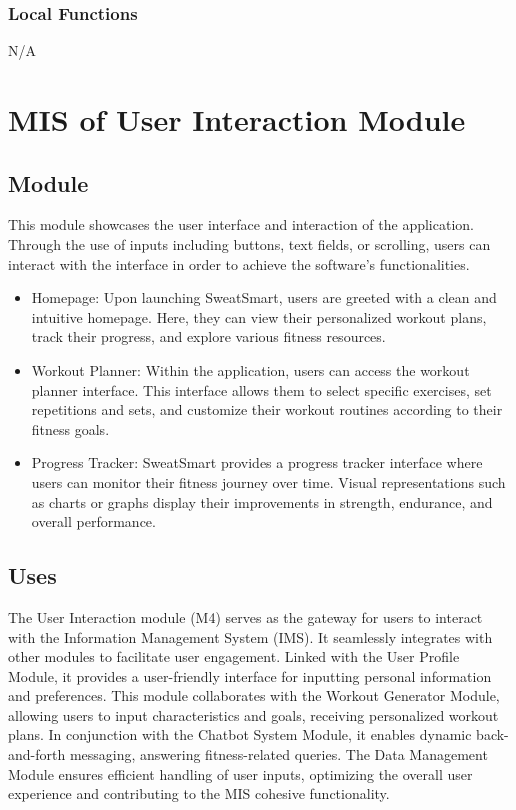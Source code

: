 \documentclass[12pt, titlepage]{article}
\begin{document}
\subsubsection{Local Functions}
N/A

\section{MIS of User Interaction Module}


\subsection{Module}
This module showcases the user interface and interaction of the application. Through the use of inputs including buttons, text fields, or scrolling, users can interact with the interface in order to achieve the software's functionalities. 

\begin{itemize}
    \item Homepage: Upon launching SweatSmart, users are greeted with a clean and intuitive homepage. Here, they can view their personalized workout plans, track their progress, and explore various fitness resources.
    \item Workout Planner: Within the application, users can access the workout planner interface. This interface allows them to select specific exercises, set repetitions and sets, and customize their workout routines according to their fitness goals.
    \item Progress Tracker: SweatSmart provides a progress tracker interface where users can monitor their fitness journey over time. Visual representations such as charts or graphs display their improvements in strength, endurance, and overall performance.
\end{itemize}


\subsection{Uses}
The User Interaction module (M4) serves as the gateway for users to interact with the Information Management System (IMS). It seamlessly integrates with other modules to facilitate user engagement. Linked with the User Profile Module, it provides a user-friendly interface for inputting personal information and preferences. This module collaborates with the Workout Generator Module, allowing users to input characteristics and goals, receiving personalized workout plans. In conjunction with the Chatbot System Module, it enables dynamic back-and-forth messaging, answering fitness-related queries. The Data Management Module ensures efficient handling of user inputs, optimizing the overall user experience and contributing to the MIS cohesive functionality.
\end{document}
